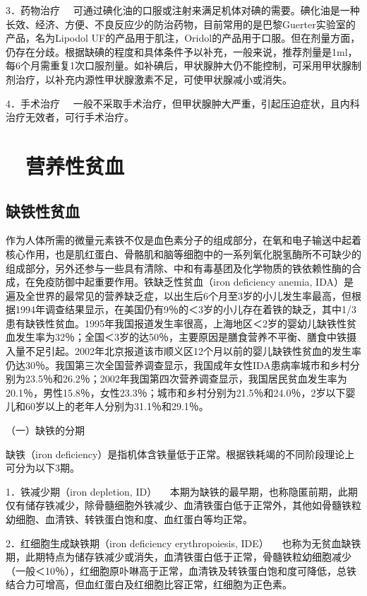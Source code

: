 {3．药物治疗}
　可通过碘化油的口服或注射来满足机体对碘的需要。碘化油是一种长效、经济、方便、不良反应少的防治药物，目前常用的是巴黎Guerter实验室的产品，名为Lipodol
UF的产品用于肌注，Oridol的产品用于口服。但在剂量方面，仍存在分歧。根据缺碘的程度和具体条件予以补充，一般来说，推荐剂量是1ml，每6个月需重复1次口服剂量。如补碘后，甲状腺肿大仍不能控制，可采用甲状腺制剂治疗，以补充内源性甲状腺激素不足，可使甲状腺减小或消失。

{4．手术治疗}
　一般不采取手术治疗，但甲状腺肿大严重，引起压迫症状，且内科治疗无效者，可行手术治疗。

\hypertarget{text00003.htmlux5cux23mllj25}{%
\section{　营养性贫血}\label{text00003.htmlux5cux23mllj25}}

\hypertarget{text00003.htmlux5cux23mllj26}{%
\subsection{缺铁性贫血}\label{text00003.htmlux5cux23mllj26}}

作为人体所需的微量元素铁不仅是血色素分子的组成部分，在氧和电子输送中起着核心作用，也是肌红蛋白、骨骼肌和脑等细胞中的一系列氧化脱氢酶所不可缺少的组成部分，另外还参与一些具有清除、中和有毒基团及化学物质的铁依赖性酶的合成，在免疫防御中起重要作用。铁缺乏性贫血（iron
deficiency anemia,
IDA）是遍及全世界的最常见的营养缺乏症，以出生后6个月至3岁的小儿发生率最高，但根据1994年调查结果显示，在美国仍有9％的＜3岁的小儿存在着铁的缺乏，其中1/3患有缺铁性贫血。1995年我国报道发生率很高，上海地区＜2岁的婴幼儿缺铁性贫血发生率为32％；全国＜3岁的达50％，主要原因是膳食营养不平衡、膳食中铁摄入量不足引起。2002年北京报道该市顺义区12个月以前的婴儿缺铁性贫血的发生率仍达30％。我国第三次全国营养调查显示，我国成年女性IDA患病率城市和乡村分别为23.5％和26.2％；2002年我国第四次营养调查显示，我国居民贫血发生率为20.1％，男性15.8％，女性23.3％；城市和乡村分别为21.5％和24.0％，2岁以下婴儿和60岁以上的老年人分别为31.1％和29.1％。

（一）缺铁的分期

缺铁（iron
deficiency）是指机体含铁量低于正常。根据铁耗竭的不同阶段理论上可分为以下3期。

{1．铁减少期（iron depletion, ID）}
　本期为缺铁的最早期，也称隐匿前期，此期仅有储存铁减少，除骨髓细胞外铁减少、血清铁蛋白低于正常外，其他如骨髓铁粒幼细胞、血清铁、转铁蛋白饱和度、血红蛋白等均正常。

{2．红细胞生成缺铁期（iron deficiency erythropoiesis, IDE）}
　也称为无贫血缺铁期，此期特点为储存铁减少或消失，血清铁蛋白低于正常，骨髓铁粒幼细胞减少（一般＜10％），红细胞原卟啉高于正常，血清铁及转铁蛋白饱和度可降低，总铁结合力可增高，但血红蛋白及红细胞比容正常，红细胞为正色素。

